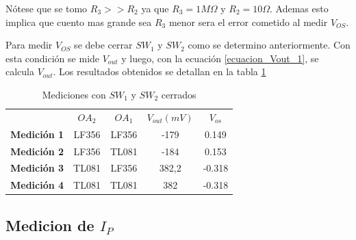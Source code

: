 Nótese que se tomo $R_3 >> R_2$ ya que $R_3 = 1M\Omega $ y $R_2 = 10\Omega$. Ademas esto implica que cuento mas grande sea $R_3$ menor sera el error cometido al medir $V_{OS}$.  

Para medir $V_{OS}$ se debe cerrar $SW_1$ y $SW_2$ como se determino anteriormente. Con esta condición se mide $V_{out}$ y luego, con la ecuación \ref{ecuacion_Vout_1}, se calcula $V_{out}$. Los resultados obtenidos se detallan en la tabla \ref{table2}

\begin{table}[h!]
    \centering
    \caption{Mediciones con $SW_1$ y $SW_2$ cerrados}
    \label{table2}
    \begin{tabular}{@{}ccccc@{}}
    
    \textbf{}           & \textbf{$OA_2$} & \textbf{$OA_1$} & \textbf{$V_{out}(mV)$} & \textbf{$V_{os}$} \\
    \textbf{Medición 1} & LF356          & LF356          & -179              &  0.149            \\
    \textbf{Medición 2} & LF356          & TL081          & -184              &  0.153            \\
    \textbf{Medición 3} & TL081          & LF356          & 382,2             &  -0.318            \\
    \textbf{Medición 4} & TL081          & TL081          & 382               &  -0.318            \\ 
    \end{tabular}
\end{table}


\subsection{Medicion de $I_{P}$}

